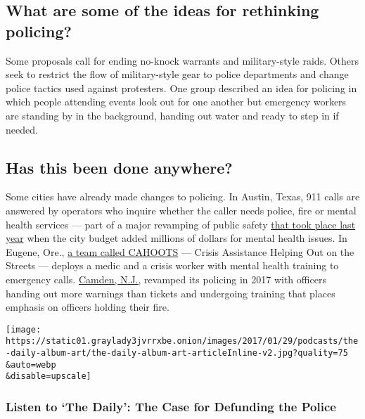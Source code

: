 \hypertarget{what-are-some-of-the-ideas-for-rethinking-policing}{%
\subsection{What are some of the ideas for rethinking
policing?}\label{what-are-some-of-the-ideas-for-rethinking-policing}}

Some proposals call for ending no-knock warrants and military-style
raids. Others seek to restrict the flow of military-style gear to police
departments and change police tactics used against protesters. One group
described an idea for policing in which people attending events look out
for one another but emergency workers are standing by in the background,
handing out water and ready to step in if needed.

\hypertarget{has-this-been-done-anywhere}{%
\subsection{Has this been done
anywhere?}\label{has-this-been-done-anywhere}}

Some cities have already made changes to policing. In Austin, Texas, 911
calls are answered by operators who inquire whether the caller needs
police, fire or mental health services --- part of a major revamping of
public safety
\href{https://www.efficientgov.com/public-safety/articles/austin-budget-adds-millions-for-mental-health-response-in-911-services-DqqgMkTaZMxXi538/}{that
took place last year} when the city budget added millions of dollars for
mental health issues. In Eugene, Ore.,
\href{https://whitebirdclinic.org/cahoots/}{a team called CAHOOTS} ---
Crisis Assistance Helping Out on the Streets --- deploys a medic and a
crisis worker with mental health training to emergency calls.
\href{https://www.nytimes3xbfgragh.onion/2017/04/02/nyregion/camden-nj-police-shootings.html}{Camden,
N.J.,} revamped its policing in 2017 with officers handing out more
warnings than tickets and undergoing training that places emphasis on
officers holding their fire.

\texttt{[image: https://static01.graylady3jvrrxbe.onion/images/2017/01/29/podcasts/the-daily-album-art/the-daily-album-art-articleInline-v2.jpg?quality=75\\\&auto=webp\\\&disable=upscale]}

\hypertarget{listen-to-the-daily-the-case-for-defunding-the-police}{%
\subsubsection{Listen to `The Daily': The Case for Defunding the
Police}\label{listen-to-the-daily-the-case-for-defunding-the-police}}

